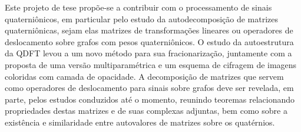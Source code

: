 Este projeto de tese prop\~oe-se a contribuir com o processamento de sinais quaterni\^onicos, em particular pelo estudo da autodecomposi\c c\~ao de matrizes quaterni\^onicas, sejam elas matrizes de transforma\c c\~oes lineares ou operadores de deslocamento sobre grafos com pesos quaterni\^onicos. O estudo da autoestrutura da QDFT levou a um novo m\'etodo para sua fracionariza\c c\~ao, juntamente com a proposta de uma vers\~ao multiparam\'etrica e um esquema de cifragem de imagens coloridas com camada de opacidade. A decomposi\c c\~ao de matrizes que servem como operadores de deslocamento para sinais sobre grafos deve ser revelada, em parte, pelos estudos conduzidos at\'e o momento, reunindo teoremas relacionando propriedades destas matrizes e de suas complexas adjuntas, bem como sobre a exist\^encia e similaridade entre autovalores de matrizes sobre os quat\'ernios.

